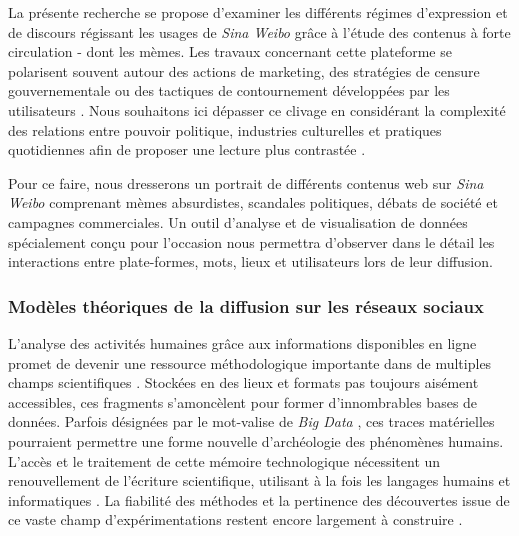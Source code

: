 La présente recherche se propose d'examiner les différents régimes d'expression et de discours régissant les usages de \textit{Sina Weibo} grâce à l'étude des contenus à forte circulation - dont les mèmes. Les travaux concernant cette plateforme se polarisent souvent autour des actions de marketing, des stratégies de censure gouvernementale \citep{Ng2013a} ou des tactiques de contournement développées par les utilisateurs \citep{Yang2014}. Nous souhaitons ici dépasser ce clivage en considérant la complexité des relations entre pouvoir politique, industries culturelles et pratiques quotidiennes afin de proposer une lecture plus contrastée \citep{Fernandez2010}.

Pour ce faire, nous dresserons un portrait de différents contenus web sur \textit{Sina Weibo} comprenant mèmes absurdistes, scandales politiques, débats de société et campagnes commerciales. Un outil d'analyse et de visualisation de données spécialement conçu pour l'occasion nous permettra d'observer dans le détail les interactions entre plate-formes, mots, lieux et utilisateurs lors de leur diffusion.


\subsubsection{Modèles théoriques de la diffusion sur les réseaux sociaux}

L'analyse des activités humaines grâce aux informations disponibles en ligne promet de devenir une ressource méthodologique importante dans de multiples champs scientifiques \citep{Schreibman2007}. Stockées en des lieux et formats pas toujours aisément accessibles, ces fragments s'amoncèlent pour former d'innombrables bases de données. Parfois désignées par le mot-valise de \textit{Big Data} \citep{Lohr2012a}, ces traces matérielles pourraient permettre une forme nouvelle d'archéologie des phénomènes humains. L'accès et le traitement de cette mémoire technologique nécessitent un renouvellement de l'écriture scientifique, utilisant à la fois les langages humains et informatiques \citep{ Guichard2014}. La fiabilité des méthodes et la pertinence des découvertes issue de ce vaste champ d'expérimentations restent encore largement à construire \citep{Boyd2011}.

